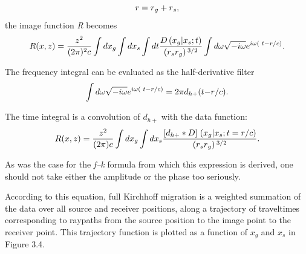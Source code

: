 \begin{equation}\text{\textit{$r$}}=\text{\textit{$r$}}_{\text{\textit{$g$}}}+\text{\textit{$r$}}_{\text{\textit{$s$}}},\end{equation}
the image function \textit{R} becomes
\begin{equation}\text{\textit{$R$}}(\text{\textit{$x,z$}}) = \frac{\text{\textit{$z$}}^2}{(2\pi )^2\text{\textit{$c$}}} \int d\text{\textit{$x$}}_{\text{\textit{$g$}}}\int
d\text{\textit{$x$}}_{\text{\textit{$s$}}}\int d\text{\textit{$t$}}\text{\textit{$ $}}\frac{\text{\textit{$D$}}\left(\text{\textit{$x$}}_{\text{\textit{$g$}}}|\text{\textit{$x$}}_{\text{\textit{$s$}}};\text{\textit{$t$}}\right)}{\left(\text{\textit{$r$}}_{\text{\textit{$s$}}}\text{\textit{$r$}}_{\text{\textit{$g$}}}\right){}^{3/2}}\int
d\omega  \sqrt{-i \omega } e^{i \omega (\text{  }\text{\textit{$t$}}\text{\textit{$-$}}\text{\textit{$r$}}/\text{\textit{$c$}})}. \end{equation}

The frequency integral can be evaluated as the half-derivative filter
\begin{equation}\int d\omega  \sqrt{-i \omega } e^{i \omega (\text{  }\text{\textit{$t$}}\text{\textit{$-$}}\text{\textit{$r$}}/\text{\textit{$c$}})}=
2\pi  \text{\textit{$d_{h+}$}}( \text{\textit{$t$}}\text{\textit{$-$}}\text{\textit{$r$}}/\text{\textit{$c$}}).\end{equation}

The time integral is a convolution of \(d_{h+}\) with the data function:
\begin{equation}\text{\textit{$R$}}(\text{\textit{$x,z$}})= \frac{\text{\textit{$z$}}^2}{(2\pi )\text{\textit{$c$}}} \int d\text{\textit{$x$}}_{\text{\textit{$g$}}}\int
d\text{\textit{$x$}}_{\text{\textit{$s$}}}\frac{\left[\text{\textit{$d_{h+}*D$}}\text{\textit{$]$}}\right.\left(\text{\textit{$x$}}_{\text{\textit{$g$}}}|\text{\textit{$x$}}_{\text{\textit{$s$}}};\text{\textit{$t$}}=\text{\textit{$r$}}/\text{\textit{$c$}}\right)}{\left(\text{\textit{$r$}}_{\text{\textit{$s$}}}\text{\textit{$r$}}_{\text{\textit{$g$}}}\right){}^{3/2}}.\end{equation}

As was the case for the \textit{f--k} formula from which this expression is derived, one should not take either the amplitude or the phase too seriously.


According to this equation, full Kirchhoff migration is a weighted summation of the data over all source and receiver positions, along a trajectory
of traveltimes corresponding to raypaths from the source position to the image point to the receiver point. This trajectory function is plotted
as a function of \(x_g\) and \(x_s\) in Figure 3.4.

